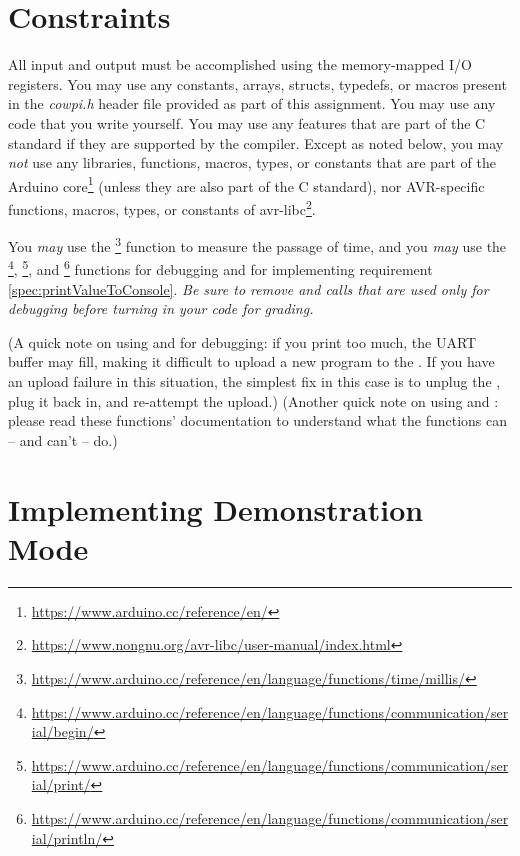 \section{Constraints}\label{sec:Constraints}

All input and output must be accomplished using the memory-mapped I/O
registers. You may use any constants, arrays, structs, typedefs, or macros
present in the \textit{cowpi.h} header file provided as part of this
assignment. You may use any code that you write yourself. You may use any
features that are part of the C standard if they are supported by the
compiler. Except as noted below, you may \textit{not} use any libraries,
functions, macros, types, or constants that are part of the Arduino
core\footnote{\url{https://www.arduino.cc/reference/en/}} (unless they are
also part of the C standard), nor AVR-specific functions, macros, types, or
constants of avr-libc\footnote{\url{https://www.nongnu.org/avr-libc/user-manual/index.html}}.

You \textit{may} use the
\footnote{\url{https://www.arduino.cc/reference/en/language/functions/time/millis/}}
function to measure the passage of time, and you \textit{may} use the
\footnote{\url{https://www.arduino.cc/reference/en/language/functions/communication/serial/begin/}},
\footnote{\url{https://www.arduino.cc/reference/en/language/functions/communication/serial/print/}}, and
\footnote{\url{https://www.arduino.cc/reference/en/language/functions/communication/serial/println/}} functions for debugging
and for implementing requirement \ref{spec:printValueToConsole}. \textit{Be
sure to remove  and  calls that are used
only for debugging before turning in your code for grading.}

(A quick note on using  and  for
debugging: if you print too much, the UART buffer may fill, making it
difficult to upload a new program to the \nano. If you have an upload
failure in this situation, the simplest fix in this case is to unplug the
\nano, plug it back in, and re-attempt the upload.) (Another quick note on
using  and : please read these functions'
documentation to understand what the functions can -- and can't -- do.)

\section{Implementing Demonstration Mode} \label{sec:DemonstrationMode}

